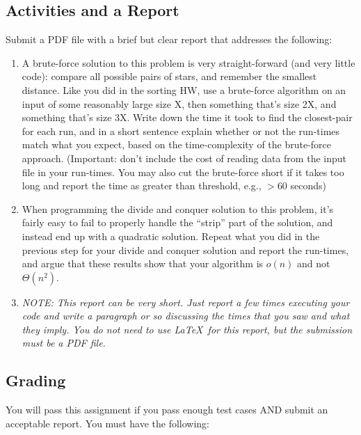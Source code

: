 \documentclass[11pt]{article}
\begin{document}
\subsection*{Activities and a Report}

Submit a PDF file with a brief but clear report that addresses the following:

\begin{enumerate}

\item A brute-force solution to this problem is very straight-forward (and very little code):  compare all possible pairs of stars, and remember the smallest distance. Like you did in the sorting HW, use a brute-force algorithm on an input of some reasonably large size X, then something that's size 2X, and something that's size 3X.  Write down the time it took to find the closest-pair for each run, and in a short sentence explain whether or not the run-times match what you expect, based on the time-complexity of the brute-force approach.  (Important: don't include the cost of reading data from the input file in your run-times. You may also cut the brute-force short if it takes too long and report the time as greater than threshold, e.g., $> 60$ seconds)

\item When programming the divide and conquer solution to this problem, it's fairly easy to fail to properly handle the ``strip'' part of the solution, and instead end up with a quadratic solution.  Repeat what you did in the previous step for your divide and conquer solution and report the run-times, and argue that these results show that your algorithm is $o(n)$ and not $\Theta(n^2)$.

\item {\em NOTE: This report can be very short. Just report a few times executing your code and write a paragraph or so discussing the times that you saw and what they imply. You do not need to use \LaTeX\ for this report, but the submission must be a PDF file.}

\end{enumerate}

\subsection*{Grading}

You will pass this assignment if you pass enough test cases AND submit an acceptable report. You must have the following:
\end{document}
